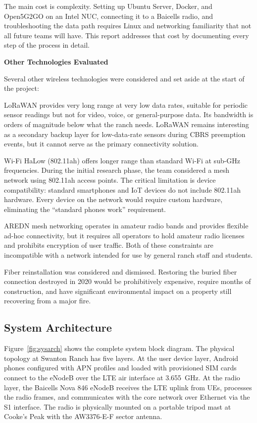 \documentclass[
    left=1.5in,
    right=1.25in,
    top=1.25in,
    bottom=1.25in
]{CalPolySeniorProject}
\begin{document}
The main cost is complexity. Setting up Ubuntu Server, Docker, and Open5G2GO on
an Intel NUC, connecting it to a Baicells radio, and troubleshooting the data
path requires Linux and networking familiarity that not all future teams will
have. This report addresses that cost by documenting every step of the process
in detail.

\textbf{Other Technologies Evaluated}

Several other wireless technologies were considered and set aside at the start of
the project:

LoRaWAN provides very long range at very low data rates, suitable for periodic
sensor readings but not for video, voice, or general-purpose data. Its bandwidth
is orders of magnitude below what the ranch needs. LoRaWAN remains interesting
as a secondary backup layer for low-data-rate sensors during CBRS preemption
events, but it cannot serve as the primary connectivity solution.

Wi-Fi HaLow (802.11ah) offers longer range than standard Wi-Fi at sub-GHz
frequencies. During the initial research phase, the team considered a mesh
network using 802.11ah access points. The critical limitation is device
compatibility: standard smartphones and IoT devices do not include 802.11ah
hardware. Every device on the network would require custom hardware, eliminating
the ``standard phones work'' requirement.

AREDN mesh networking operates in amateur radio bands and provides flexible
ad-hoc connectivity, but it requires all operators to hold amateur radio licenses
and prohibits encryption of user traffic. Both of these constraints are
incompatible with a network intended for use by general ranch staff and students.

Fiber reinstallation was considered and dismissed. Restoring the buried fiber
connection destroyed in 2020 would be prohibitively expensive, require months of
construction, and have significant environmental impact on a property still
recovering from a major fire.

\subsection{System Architecture}

Figure~\ref{fig:sysarch} shows the complete system block diagram.
The physical topology at Swanton Ranch has five layers. At the user device
layer, Android phones configured with APN profiles and loaded with provisioned
SIM cards connect to the eNodeB over the LTE air interface at 3.655~GHz. At the
radio layer, the Baicells Nova 846 eNodeB receives the LTE uplink from UEs,
processes the radio frames, and communicates with the core network over Ethernet
via the S1 interface. The radio is physically mounted on a portable tripod mast
at Cooke's Peak with the AW3376-E-F sector antenna.
\end{document}
